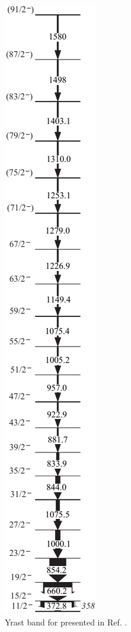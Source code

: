 \begin{figure}[t!]
\centerline{\includegraphics[height=0.7\textheight]{./img/c4/high_spin_yrast.pdf}}
	\caption{Yrast band for \pr{} presented in Ref. \cite{ePaul135Pr}. \label{fig:chp4-paul-prev-bands}}
\end{figure}

